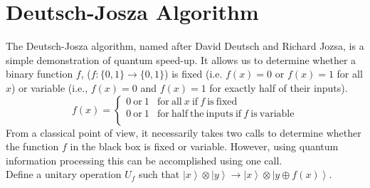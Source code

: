 \documentclass[11pt]{article} %
\newcommand{\ket}[1]{\left|#1\right\rangle}
\begin{document}
\section{Deutsch-Josza Algorithm}
The Deutsch-Josza algorithm, named after David Deutsch and Richard Jozsa, is a simple demonstration of quantum speed-up. It allows us to determine whether a binary function $f$, ($f: \{0,1\} \rightarrow \{0,1\}$) is fixed (i.e. $f(x)=0$ or $f(x)=1$ for all $x$) or variable (i.e., $f(x)=0$ and $f(x)=1$ for exactly half of their inputs).
\begin{equation}
     \label{eq:f1}
     f(x) = \left\{
	       \begin{array}{ll}
		 0 \mathrm{\ or\ } 1      & \mathrm{for\ all\ } x \mathrm{\ if\ } f \mathrm{\ is\ fixed\ }\\
		 0 \mathrm{\ or\ } 1      & \mathrm{for\ half\ the\ inputs\ } \mathrm{if\ } f \mathrm{\ is\ variable}\\
	       \end{array}
	     \right.
   \end{equation}
From a classical point of view, it necessarily takes two calls to determine whether the function $f$ in the black box is fixed or variable. However, using quantum information processing this can be accomplished using one call.\\
Define a unitary operation $U_f$ such that $\ket{x} \otimes \ket{y} \rightarrow \ket{x} \otimes \ket{y \oplus f(x)}$.
\end{document}
